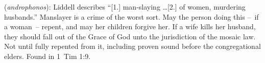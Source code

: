 \item[Husband-murderer,]

(\textit{androphonos}):
Liddell describes ``[1.] man-slaying \ldots [2.] of women, murdering husbands.'' Manslayer is a crime of the worst sort. May the person doing this --~if a woman~-- repent, and may her children forgive her. If a wife kills her husband, they should fall out of the Grace of God unto the jurisdiction of the mosaic law. Not until fully repented from it, including proven sound before the congregational elders.
Found in 1~Tim 1:9.
